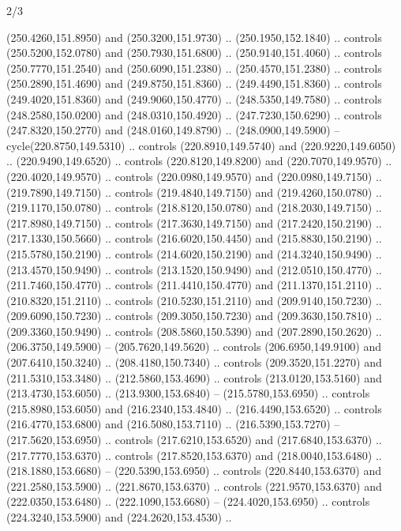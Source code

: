 \begin{flagdescription}{2/3}
\begin{scope}[xshift=0.5\flaglength,yshift=0.5\flagwidth,scale=\flagwidth/259.2]
\begin{scope}[y=0.8pt, x=0.8pt, yscale=-1,shift={(-243,-162)}]
      (250.4260,151.8950) and (250.3200,151.9730) .. (250.1950,152.1840) .. controls
      (250.5200,152.0780) and (250.7930,151.6800) .. (250.9140,151.4060) .. controls
      (250.7770,151.2540) and (250.6090,151.2380) .. (250.4570,151.2380) .. controls
      (250.2890,151.4690) and (249.8750,151.8360) .. (249.4490,151.8360) .. controls
      (249.4020,151.8360) and (249.9060,150.4770) .. (248.5350,149.7580) .. controls
      (248.2580,150.0200) and (248.0310,150.4920) .. (247.7230,150.6290) .. controls
      (247.8320,150.2770) and (248.0160,149.8790) .. (248.0900,149.5900) --
      cycle(220.8750,149.5310) .. controls (220.8910,149.5740) and
      (220.9220,149.6050) .. (220.9490,149.6520) .. controls (220.8120,149.8200) and
      (220.7070,149.9570) .. (220.4020,149.9570) .. controls (220.0980,149.9570) and
      (220.0980,149.7150) .. (219.7890,149.7150) .. controls (219.4840,149.7150) and
      (219.4260,150.0780) .. (219.1170,150.0780) .. controls (218.8120,150.0780) and
      (218.2030,149.7150) .. (217.8980,149.7150) .. controls (217.3630,149.7150) and
      (217.2420,150.2190) .. (217.1330,150.5660) .. controls (216.6020,150.4450) and
      (215.8830,150.2190) .. (215.5780,150.2190) .. controls (214.6020,150.2190) and
      (214.3240,150.9490) .. (213.4570,150.9490) .. controls (213.1520,150.9490) and
      (212.0510,150.4770) .. (211.7460,150.4770) .. controls (211.4410,150.4770) and
      (211.1370,151.2110) .. (210.8320,151.2110) .. controls (210.5230,151.2110) and
      (209.9140,150.7230) .. (209.6090,150.7230) .. controls (209.3050,150.7230) and
      (209.3630,150.7810) .. (209.3360,150.9490) .. controls (208.5860,150.5390) and
      (207.2890,150.2620) .. (206.3750,149.5900) -- (205.7620,149.5620) .. controls
      (206.6950,149.9100) and (207.6410,150.3240) .. (208.4180,150.7340) .. controls
      (209.3520,151.2270) and (211.5310,153.3480) .. (212.5860,153.4690) .. controls
      (213.0120,153.5160) and (213.4730,153.6050) .. (213.9300,153.6840) --
      (215.5780,153.6950) .. controls (215.8980,153.6050) and (216.2340,153.4840) ..
      (216.4490,153.6520) .. controls (216.4770,153.6800) and (216.5080,153.7110) ..
      (216.5390,153.7270) -- (217.5620,153.6950) .. controls (217.6210,153.6520) and
      (217.6840,153.6370) .. (217.7770,153.6370) .. controls (217.8520,153.6370) and
      (218.0040,153.6480) .. (218.1880,153.6680) -- (220.5390,153.6950) .. controls
      (220.8440,153.6370) and (221.2580,153.5900) .. (221.8670,153.6370) .. controls
      (221.9570,153.6370) and (222.0350,153.6480) .. (222.1090,153.6680) --
      (224.4020,153.6950) .. controls (224.3240,153.5900) and (224.2620,153.4530) ..

\end{scope}
\end{scope}
\end{flagdescription}
